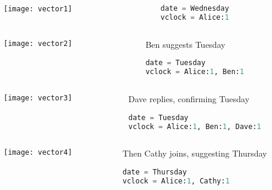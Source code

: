 \documentclass[aspectratio=169, 15pt,usenames,dvipsnames]{beamer}
\begin{document}
	\cprotEnv\begin{gdblank}
	\begin{columns}
		\begin{column}{0.5\textwidth}
			\texttt{[image: vector1]}			
		\end{column}
		\begin{column}{0.5\textwidth}				
			\begin{lstlisting}[language=Python]
date = Wednesday
vclock = Alice:1
			\end{lstlisting}
		\end{column}	
	\end{columns} 
	\end{gdblank}
	\cprotEnv\begin{gdblank}
	\begin{columns}
		\begin{column}{0.5\textwidth}
			\texttt{[image: vector2]}			
		\end{column}
		\begin{column}{0.5\textwidth}				
			Ben suggests Tuesday
			\begin{lstlisting}[language=Python]
date = Tuesday
vclock = Alice:1, Ben:1
			\end{lstlisting}
		\end{column}	
	\end{columns} 
	\end{gdblank}
	\cprotEnv\begin{gdblank}
	\begin{columns}
		\begin{column}{0.5\textwidth}
			\texttt{[image: vector3]}			
		\end{column}
		\begin{column}{0.5\textwidth}				
			Dave replies, confirming Tuesday
			\begin{lstlisting}[language=Python]
date = Tuesday
vclock = Alice:1, Ben:1, Dave:1
			\end{lstlisting}
		\end{column}	
	\end{columns} 
	\end{gdblank}
	\cprotEnv\begin{gdblank}
	\begin{columns}
		\begin{column}{0.5\textwidth}
			\texttt{[image: vector4]}			
		\end{column}
		\begin{column}{0.5\textwidth}				
			Then Cathy joins, suggesting Thursday
			\begin{lstlisting}[language=Python]
date = Thursday
vclock = Alice:1, Cathy:1
			\end{lstlisting}
		\end{column}	
	\end{columns} 
	\end{gdblank}
\end{document}
